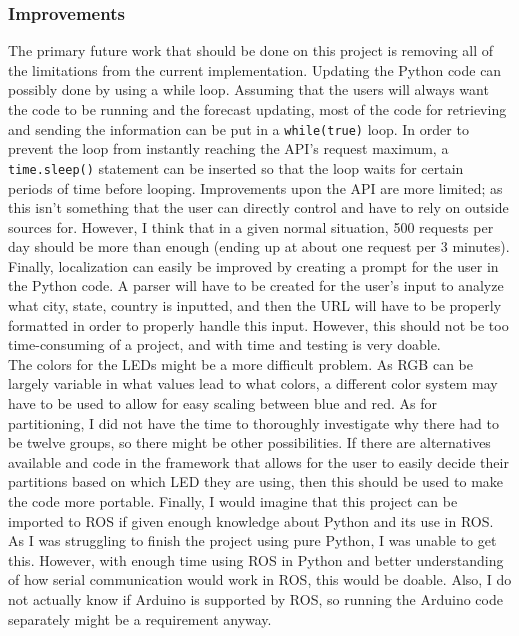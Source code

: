 \documentclass[12pt]{article}
\begin{document}
\subsubsection{Improvements}
The primary future work that should be done on this project is removing all of the limitations from the current implementation. Updating the Python code can possibly done by using a while loop. Assuming that the users will always want the code to be running and the forecast updating, most of the code for retrieving and sending the information can be put in a \texttt{while(true)} loop. In order to prevent the loop from instantly reaching the API's request maximum, a \texttt{time.sleep()} statement can be inserted so that the loop waits for certain periods of time before looping. Improvements upon the API are more limited; as this isn't something that the user can directly control and have to rely on outside sources for. However, I think that in a given normal situation, 500 requests per day should be more than enough (ending up at about one request per 3 minutes). Finally, localization can easily be improved by creating a prompt for the user in the Python code. A parser will have to be created for the user's input to analyze what city, state, country is inputted, and then the URL will have to be properly formatted in order to properly handle this input. However, this should not be too time-consuming of a project, and with time and testing is very doable.\\
\indent The colors for the LEDs might be a more difficult problem. As RGB can be largely variable in what values lead to what colors, a different color system may have to be used to allow for easy scaling between blue and red. As for partitioning, I did not have the time to thoroughly investigate why there had to be twelve groups, so there might be other possibilities. If there are alternatives available and code in the framework that allows for the user to easily decide their partitions based on which LED they are using, then this should be used to make the code more portable. Finally, I would imagine that this project can be imported to ROS if given enough knowledge about Python and its use in ROS. As I was struggling to finish the project using pure Python, I was unable to get this. However, with enough time using ROS in Python and better understanding of how serial communication would work in ROS, this would be doable. Also, I do not actually know if Arduino is supported by ROS, so running the Arduino code separately might be a requirement anyway.
\end{document}
